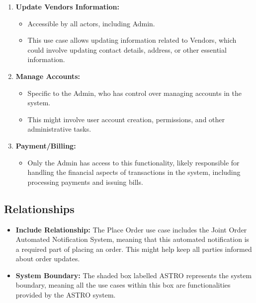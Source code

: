\begin{enumerate}
    \item \textbf{Update Vendors Information:}
          \begin{itemize}
              \item Accessible by all actors, including Admin.
              \item This use case allows updating information related to Vendors, which could involve updating contact details, address, or other essential information.
          \end{itemize}

    \item \textbf{Manage Accounts:}
          \begin{itemize}
              \item Specific to the Admin, who has control over managing accounts in the system.
              \item This might involve user account creation, permissions, and other administrative tasks.
          \end{itemize}

    \item \textbf{Payment/Billing:}
          \begin{itemize}
              \item Only the Admin has access to this functionality, likely responsible for handling the financial aspects of transactions in the system, including processing payments and issuing bills.
          \end{itemize}
\end{enumerate}
\subsection{Relationships}

\begin{itemize}
    \item \textbf{Include Relationship:}
          The Place Order use case includes the Joint Order Automated Notification System, meaning that this automated notification is a required part of placing an order. This might help keep all parties informed about order updates.


    \item \textbf{System Boundary:}
          The shaded box labelled ASTRO represents the system boundary, meaning all the use cases within this box are functionalities provided by the ASTRO system.

\end{itemize}